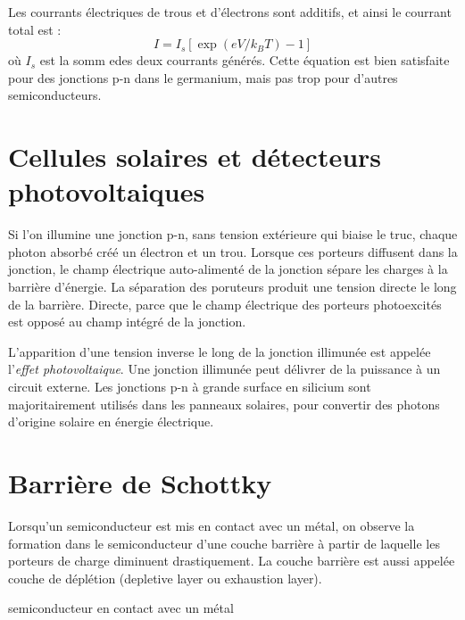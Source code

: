 Les courrants électriques de trous et d'électrons sont additifs, et ainsi le
courrant total est :
\begin{equation}
    I = I_s [\exp(eV/k_BT)-1]
\end{equation}
où $I_s$ est la somm edes deux courrants générés. Cette équation est bien
satisfaite pour des jonctions p-n dans le germanium, mais pas trop pour d'autres
semiconducteurs.

\section{Cellules solaires et détecteurs photovoltaiques}

Si l'on illumine une jonction p-n, sans tension extérieure qui biaise le truc,
chaque photon absorbé créé un électron et un trou. Lorsque ces porteurs diffusent
dans la jonction, le champ électrique auto-alimenté de la jonction sépare les
charges à la barrière d'énergie. La séparation des poruteurs produit une tension
directe le long de la barrière. Directe, parce que le champ électrique des
porteurs photoexcités est opposé au champ intégré de la jonction.

L'apparition d'une tension inverse le long de la jonction illimunée est appelée
l'\emph{effet photovoltaique}. Une jonction illimunée peut délivrer de la
puissance à un circuit externe. Les jonctions p-n à grande surface en silicium
sont majoritairement utilisés dans les panneaux solaires, pour convertir des
photons d'origine solaire en énergie électrique.

\section{Barrière de Schottky}

Lorsqu'un semiconducteur est mis en contact avec un métal, on observe la
formation dans le semiconducteur d'une couche barrière à partir de laquelle les
porteurs de charge diminuent drastiquement. La couche barrière est aussi appelée
couche de déplétion (depletive layer ou exhaustion layer).

\begin{marginfigure}
    \TODO
    \caption{semiconducteur en contact avec un métal}
    \label{semicondmetal}
\end{marginfigure}

